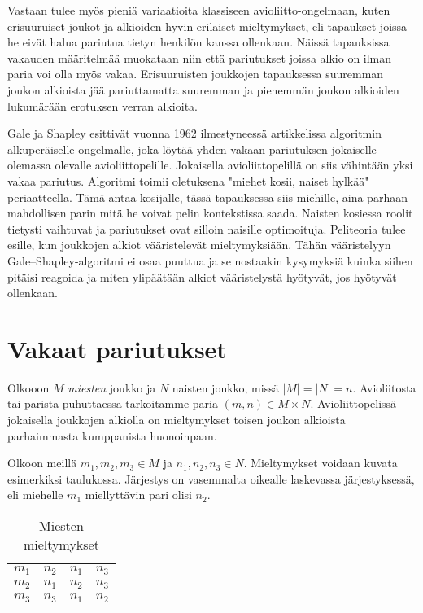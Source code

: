 \documentclass[finnish]{tktltiki2}
\theoremstyle{definition}
\theoremstyle{remark}
\begin{document}
Vastaan tulee myös pieniä variaatioita klassiseen avioliitto-ongelmaan, kuten erisuuruiset joukot ja alkioiden hyvin erilaiset mieltymykset, eli tapaukset joissa he eivät halua pariutua tietyn henkilön kanssa ollenkaan. Näissä tapauksissa vakauden määritelmää muokataan niin että pariutukset joissa alkio on ilman paria voi olla myös vakaa. Erisuuruisten joukkojen tapauksessa suuremman joukon alkioista jää pariuttamatta suuremman ja pienemmän joukon alkioiden lukumärään erotuksen verran alkioita.

Gale ja Shapley esittivät vuonna 1962 ilmestyneessä artikkelissa \cite{gale62a} algoritmin alkuperäiselle ongelmalle, joka löytää yhden vakaan pariutuksen jokaiselle olemassa olevalle avioliittopelille. Jokaisella avioliittopelillä on siis vähintään yksi vakaa pariutus. Algoritmi toimii oletuksena "miehet kosii, naiset hylkää" periaatteella. Tämä antaa kosijalle, tässä tapauksessa siis miehille, aina parhaan mahdollisen parin mitä he voivat pelin kontekstissa saada. Naisten kosiessa roolit tietysti vaihtuvat ja pariutukset ovat silloin naisille optimoituja.
Peliteoria tulee esille, kun joukkojen alkiot vääristelevät mieltymyksiään. Tähän vääristelyyn Gale--Shapley-algoritmi ei osaa puuttua ja se nostaakin kysymyksiä kuinka siihen pitäisi reagoida ja miten ylipäätään alkiot vääristelystä hyötyvät, jos hyötyvät ollenkaan.


\section{Vakaat pariutukset}
Olkooon $M$ \emph{miesten} joukko ja $N$ naisten joukko, missä $|M| = |N| = n$. Avioliitosta tai parista puhuttaessa tarkoitamme paria $(m, n) \in M \times N$. Avioliittopelissä jokaisella joukkojen alkiolla on mieltymykset toisen joukon alkioista parhaimmasta kumppanista huonoinpaan.

Olkoon meillä $m_1, m_2, m_3 \in M$ ja $n_1, n_2, n_3 \in N$. Mieltymykset voidaan kuvata esimerkiksi taulukossa. Järjestys on vasemmalta oikealle laskevassa järjestyksessä, eli miehelle $m_1$ miellyttävin pari olisi $n_2$.
\begin{table}[h!]
\begin{center}
	\begin{tabular}{ l | *{2}{c} r }
	 &  \\
	 \hline
 	 $m_{1}$ & $n_{2}$ & $n_{1}$ & $n_{3}$ \\
 	 $m_{2}$ & $n_{1}$ & $n_{2}$ & $n_{3}$ \\
 	 $m_{3}$ & $n_{3}$ & $n_{1}$ & $n_{2}$ \\
	\end{tabular}
	\caption{Miesten mieltymykset}
\end{center}
\end{table}
\end{document}

